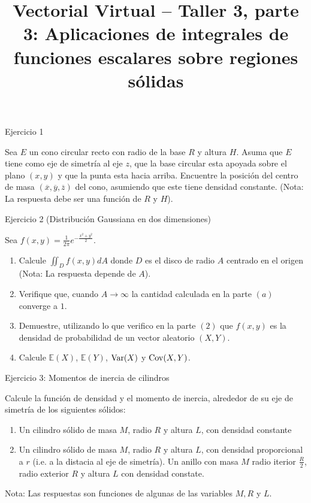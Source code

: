\documentclass[usepdftitle=false]{beamer}
\title[]{Vectorial Virtual -- Taller 3, parte 3: Aplicaciones de integrales de funciones escalares sobre regiones s\'olidas}
\date{}
\begin{document}
\begin{frame}
  \titlepage
\end{frame}

\begin{frame}{Ejercicio 1}

Sea $E$ un cono circular recto con radio de la base $R$ y altura $H$. Asuma que $E$ tiene como eje de simetr\'ia al eje $z$, que la base circular esta apoyada sobre el plano $(x,y)$ y que la punta esta hacia arriba. Encuentre la posici\'on del centro de masa $(\overline{x}, \overline{y}, \overline{z})$ del cono, asumiendo que este tiene densidad constante. (Nota: La respuesta debe ser una funci\'on de $R$ y $H$). 

\end{frame}

\begin{frame}{Ejercicio 2 (Distribuci\'on Gaussiana en dos dimensiones)}

Sea $f(x,y)= \frac{1}{2\pi} e^{-\frac{x^2+y^2}{2}}$.
\begin{enumerate}
\item Calcule $\iint_Df(x,y)dA$ donde $D$ es el disco de radio $A$ centrado en el origen (Nota: La respuesta depende de $A$).
\item Verifique que, cuando $A\rightarrow \infty$ la cantidad calculada en la parte $(a)$ converge a $1$.
\item Demuestre, utilizando lo que verifico en la parte $(2)$ que $f(x,y)$ es la densidad de probabilidad de un vector aleatorio $(X,Y)$.
\item Calcule $\mathbb{E}(X)$, $\mathbb{E}(Y)$, ${\rm Var}(X)$ y ${\rm Cov}(X,Y)$.
 
\end{enumerate}
\end{frame}

\begin{frame}{Ejercicio 3: Momentos de inercia de cilindros}

Calcule la funci\'on de densidad y el momento de inercia, alrededor de su eje de simetr\'ia de los siguientes s\'olidos:

\begin{enumerate}
\item Un cilindro s\'olido de masa $M$, radio $R$ y altura $L$, con densidad constante
\item Un cilindro s\'olido de masa $M$, radio $R$ y altura $L$, con densidad proporcional a $r$ (i.e. a la distacia al eje de simetr\'ia).
\iem Un anillo con masa $M$ radio iterior $\frac{R}{2}$, radio exterior $R$ y altura $L$ con densidad constate. 
\end{enumerate}
Nota: Las respuestas son funciones de algunas de las variables $M,R$ y $L$.
\end{frame}
\end{document}
